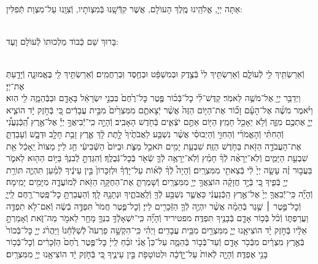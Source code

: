 \documentclass[twoside, openany, parskip=half, 11pt]{book}
\begin{document}
\\
אַתָּה יְיָ, אֱלֹהֵֽינוּ מֶֽלֶךְ הָעוֺלָם, אֲשֶׁר קִדְּֿֿשָֽׁנוּ בְּֿמִצְוֹתָיו, וְֿצִוָֽנוּ עַל־מִצְוַת תְּֿפִלִּין:

\\
בָּרוּךְ שֵׁם כְּֿבוֺד מַלְכוּתוֺ לְֿעוֺלָם וָעֶד:


\\
וְֿאֵרַשְׂתִּ֥יךְ לִ֖י לְֿעוֹלָ֑ם וְֿאֵרַשְׂתִּ֥יךְ לִי֙ בְּֿצֶ֣דֶק וּבְמִשְׁפָּ֔ט וּבְחֶ֖סֶד וּֽבְרַחֲמִֽים׃ וְֿאֵרַשְׂתִּ֥יךְ לִ֖י בֶּאֱמוּנָ֑ה וְֿיָדַ֖עַתְּ אֶת־יְיָ׃\\
וַיְדַבֵּ֥ר יְיָ֖ אֶל־מֹשֶׁ֥ה לֵּאמֹֽר׃ קַדֶּשׁ־לִ֨י כׇל־בְּֿכ֜וֹר פֶּ֤טֶר כׇּל־רֶ֙חֶם֙ בִּבְנֵ֣י יִשְׂרָאֵ֔ל בָּאָדָ֖ם וּבַבְּֿהֵמָ֑ה לִ֖י הֽוּא׃ וַיֹּ֨אמֶר מֹשֶׁ֜ה אֶל־הָעָ֗ם זָכ֞וֹר אֶת־הַיּ֤וֹם הַזֶּה֙ אֲשֶׁ֨ר יְֿצָאתֶ֤ם מִמִּצְרַ֙יִם֙ מִבֵּ֣ית עֲבָדִ֔ים כִּ֚י בְּֿחֹ֣זֶק יָ֔ד הוֹצִ֧יא יְיָ֛ אֶתְכֶ֖ם מִזֶּ֑ה וְֿלֹ֥א יֵאָכֵ֖ל חָמֵֽץ׃ הַיּ֖וֹם אַתֶּ֣ם יֹצְֿאִ֑ים בְּֿחֹ֖דֶשׁ הָאָבִֽיב׃ וְֿהָיָ֣ה כִֽי־יְֿֿבִיאֲךָ֣ יְיָ֡ אֶל־אֶ֣רֶץ הַֽ֠כְּֿנַעֲנִ֠י וְֿהַחִתִּ֨י וְֿהָאֱמֹרִ֜י וְֿהַחִוִּ֣י וְֿהַיְבוּסִ֗י אֲשֶׁ֨ר נִשְׁבַּ֤ע לַאֲבֹתֶ֙יךָ֙ לָ֣תֶת לָ֔ךְ אֶ֛רֶץ זָבַ֥ת חָלָ֖ב וּדְבָ֑שׁ וְֿעָבַדְתָּ֛ אֶת־הָעֲבֹדָ֥ה הַזֹּ֖את בַּחֹ֥דֶשׁ הַזֶּֽה׃ שִׁבְעַ֥ת יָמִ֖ים תֹּאכַ֣ל מַצֹּ֑ת וּבַיּוֹם֙ הַשְּֿׁבִיעִ֔י חַ֖ג לַייָ׃ מַצּוֹת֙ יֵֽאָכֵ֔ל אֵ֖ת שִׁבְעַ֣ת הַיָּמִ֑ים וְֿלֹֽא־יֵרָאֶ֨ה לְֿךָ֜ חָמֵ֗ץ וְֿלֹֽא־יֵרָאֶ֥ה לְֿךָ֛ שְֿׂאֹ֖ר בְּֿכׇל־גְּֿבֻלֶֽךָ׃ וְֿהִגַּדְתָּ֣ לְֿבִנְךָ֔ בַּיּ֥וֹם הַה֖וּא לֵאמֹ֑ר בַּעֲב֣וּר זֶ֗ה עָשָׂ֤ה יְיָ֙ לִ֔י בְּֿצֵאתִ֖י מִמִּצְרָֽיִם׃ וְֿהָיָה֩ לְֿךָ֨ לְֿא֜וֹת עַל־יָדְֿךָ֗ וּלְזִכָּרוֹן֙ בֵּ֣ין עֵינֶ֔יךָ לְֿמַ֗עַן תִּהְיֶ֛ה תּוֹרַ֥ת יְיָ֖ בְּֿפִ֑יךָ כִּ֚י בְּֿיָ֣ד חֲזָקָ֔ה הוֹצִֽאֲךָ֥ יְיָ֖ מִמִּצְרָֽיִם׃ וְֿשָׁמַרְתָּ֛ אֶת־הַחֻקָּ֥ה הַזֹּ֖את לְֿמוֹעֲדָ֑הּ מִיָּמִ֖ים יָמִֽימָה׃\\

וְֿהָיָ֞ה כִּֽי־יְֿֿבִאֲךָ֤ יְיָ֙ אֶל־אֶ֣רֶץ הַֽכְּֿנַעֲנִ֔י כַּאֲשֶׁ֛ר נִשְׁבַּ֥ע לְֿךָ֖ וְֿלַֽאֲבֹתֶ֑יךָ וּנְתָנָ֖הּ לָֽךְ׃ וְֿהַעֲבַרְתָּ֥ כׇל־פֶּֽטֶר־רֶ֖חֶם לַֽייָ֑ וְֿכׇל־פֶּ֣טֶר ׀ שֶׁ֣גֶר בְּֿהֵמָ֗ה אֲשֶׁ֨ר יִהְיֶ֥ה לְֿךָ֛ הַזְּֿכָרִ֖ים לַייָ׃ וְֿכׇל־פֶּ֤טֶר חֲמֹר֙ תִּפְדֶּ֣ה בְֿשֶׂ֔ה וְֿאִם־לֹ֥א תִפְדֶּ֖ה וַעֲרַפְתּ֑וֹ וְֿכֹ֨ל בְּֿכ֥וֹר אָדָ֛ם בְּֿבָנֶ֖יךָ תִּפְדֶּֽה׃ מפטיריד וְֿהָיָ֞ה כִּֽי־יִשְׁאָלְֿךָ֥ בִנְךָ֛ מָחָ֖ר לֵאמֹ֣ר מַה־זֹּ֑את וְֿאָמַרְתָּ֣ אֵלָ֔יו בְּֿחֹ֣זֶק יָ֗ד הוֹצִיאָ֧נוּ יְיָ֛ מִמִּצְרַ֖יִם מִבֵּ֥ית עֲבָדִֽים׃ וַיְהִ֗י כִּֽי־הִקְשָׁ֣ה פַרְעֹה֮ לְֿשַׁלְּֿחֵ֒נוּ֒ וַיַּהֲרֹ֨ג יְיָ֤ כׇּל־בְּֿכוֹר֙ בְּֿאֶ֣רֶץ מִצְרַ֔יִם מִבְּֿכֹ֥ר אָדָ֖ם וְֿעַד־בְּֿכ֣וֹר בְּֿהֵמָ֑ה עַל־כֵּן֩ אֲנִ֨י זֹבֵ֜חַ לַֽייָ֗ כׇּל־פֶּ֤טֶר רֶ֙חֶם֙ הַזְּֿכָרִ֔ים וְֿכׇל־בְּֿכ֥וֹר בָּנַ֖י אֶפְדֶּֽה׃ וְֿהָיָ֤ה לְֿאוֹת֙ עַל־יָ֣דְֿכָ֔ה וּלְטוֹטָפֹ֖ת בֵּ֣ין עֵינֶ֑יךָ כִּ֚י בְּֿחֹ֣זֶק יָ֔ד הוֹצִיאָ֥נוּ יְיָ֖ מִמִּצְרָֽיִם׃
\end{document}
